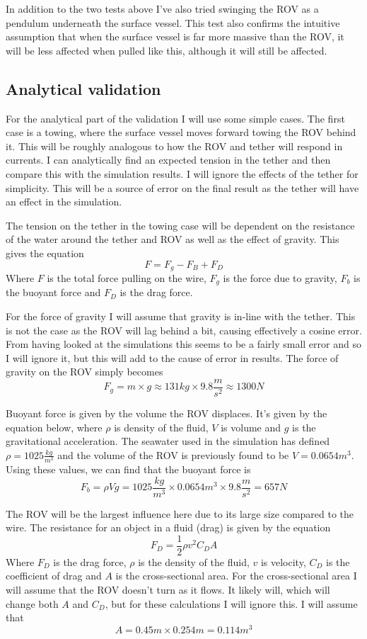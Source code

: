 In addition to the two tests above I've also tried swinging the ROV as a pendulum underneath the surface vessel. This test also confirms the intuitive assumption that when the surface vessel is far more massive than the ROV, it will be less affected when pulled like this, although it will still be affected. 

\subsection{Analytical validation}
For the analytical part of the validation I will use some simple cases. The first case is a towing, where the surface vessel moves forward towing the ROV behind it. This will be roughly analogous to how the ROV and tether will respond in currents. I can analytically find an expected tension in the tether and then compare this with the simulation results. I will ignore the effects of the tether for simplicity. This will be a source of error on the final result as the tether will have an effect in the simulation.

The tension on the tether in the towing case will be dependent on the resistance of the water around the tether and ROV as well as the effect of gravity. This gives the equation 
\[F = F_g - F_B + F_D\]
Where \(F\) is the total force pulling on the wire, \(F_g\) is the force due to gravity, \(F_b\) is the buoyant force and \(F_D\) is the drag force. 

For the force of gravity I will assume that gravity is in-line with the tether. This is not the case as the ROV will lag behind a bit, causing effectively a cosine error. From having looked at the simulations this seems to be a fairly small error and so I will ignore it, but this will add to the cause of error in results. The force of gravity on the ROV simply becomes 
\[F_g = m \times g \approx 131kg \times 9.8\frac{m}{s^2} \approx 1300N\] 

Buoyant force is given by the volume the ROV displaces. It's given by the equation below, where \(\rho\) is density of the fluid, \(V\) is volume and \(g\) is the gravitational acceleration. The seawater used in the simulation has defined \(\rho = 1025\frac{kg}{m^3}\) and the volume of the ROV is previously found to be \(V=0.0654m^3\). Using these values, we can find that the buoyant force is 
\[F_b = \rho V g = 1025\frac{kg}{m^3} \times 0.0654m^3 \times 9.8\frac{m}{s^2} = 657N\]

The ROV will be the largest influence here due to its large size compared to the wire. The resistance for an object in a fluid (drag) is given by the equation 
\[F_D = \frac 1 2 \rho v^2 C_D A\]
Where \(F_D\) is the drag force, \(\rho\) is the density of the fluid, \(v\) is velocity, \(C_D\) is the coefficient of drag and \(A\) is the cross-sectional area. For the cross-sectional area I will assume that the ROV doesn't turn as it flows. It likely will, which will change both \(A\) and \(C_D\), but for these calculations I will ignore this. I will assume that \[A = 0.45m\times 0.254m = 0.114m^3\]


